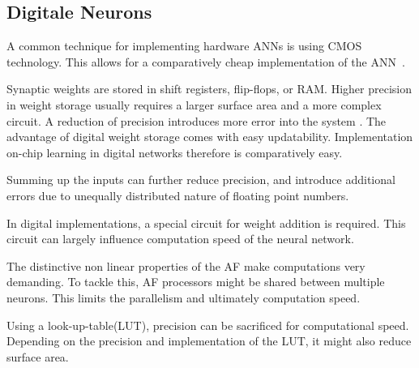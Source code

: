 \documentclass[conference]{IEEEtran}
\begin{document}
    \subsection{Digitale Neurons}

    A common technique for implementing hardware ANNs is using CMOS technology.
    This allows for a comparatively cheap implementation of the ANN~\cite{misra2010artificial}.

    Synaptic weights are stored in shift registers, flip-flops, or RAM\@.
    Higher precision in weight storage usually requires a larger surface area and a more complex circuit.
    A reduction of precision introduces more error into the system \cite{Nichols02feasibilityof}.
    The advantage of digital weight storage comes with easy updatability.
    Implementation on-chip learning in digital networks therefore is comparatively easy.

    Summing up the inputs can further reduce precision, and introduce additional errors due to unequally distributed nature of floating point numbers.

    In digital implementations, a special circuit for weight addition is required.
    This circuit can largely influence computation speed of the neural network.

    The distinctive non linear properties of the AF make computations very demanding.
    To tackle this, AF processors might be shared between multiple neurons.
    This limits the parallelism and ultimately computation speed.


    Using a look-up-table(LUT), precision can be sacrificed for computational speed.
    Depending on the precision and implementation of the LUT, it might also reduce surface area.



\end{document}
